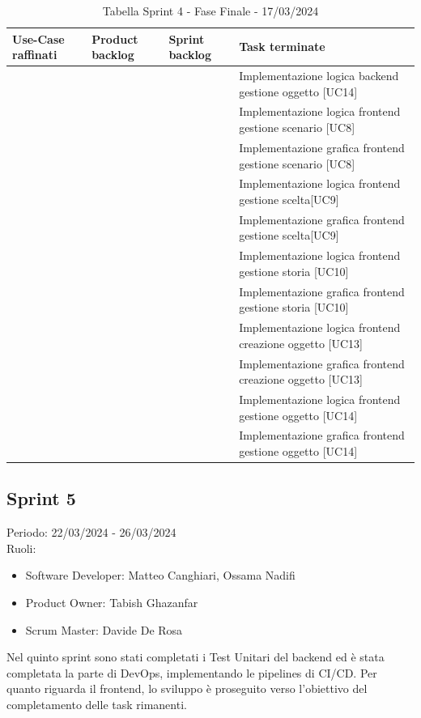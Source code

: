 \documentclass{article}
\begin{document}
\begin{table}[h]
    \centering
    \begin{tabularx}{\textwidth}{|X|X|X|X|}
        \hline
        \bf Use-Case raffinati & \bf Product backlog & \bf Sprint backlog & \bf Task terminate \\
        \hline
        & & & Implementazione logica backend gestione oggetto [UC14] \\
        \hline
        & & & Implementazione logica frontend gestione scenario [UC8] \\
        \hline
        & & & Implementazione grafica frontend gestione scenario [UC8] \\
        \hline
        & & & Implementazione logica frontend gestione scelta[UC9] \\
        \hline
        & & & Implementazione grafica frontend gestione scelta[UC9] \\
        \hline
        & & & Implementazione logica frontend gestione storia [UC10] \\
        \hline
        & & & Implementazione grafica frontend gestione storia [UC10] \\
        \hline
        & & & Implementazione logica frontend creazione oggetto [UC13] \\
        \hline
        & & & Implementazione grafica frontend creazione oggetto [UC13] \\
        \hline
        & & & Implementazione logica frontend gestione oggetto [UC14] \\
        \hline
        & & & Implementazione grafica frontend gestione oggetto [UC14] \\
        \hline
    \end{tabularx}
    \caption*{Tabella Sprint 4 - Fase Finale - 17/03/2024}
\end{table}

\clearpage
\subsection{Sprint 5}
Periodo: 22/03/2024 - 26/03/2024\vspace*{7pt}\\
Ruoli:
\begin{itemize}[label = { }]
    \itemsep0em
    \item Software Developer: Matteo Canghiari, Ossama Nadifi 
    \item Product Owner: Tabish Ghazanfar
    \item Scrum Master: Davide De Rosa
\end{itemize}
Nel quinto sprint sono stati completati i Test Unitari del backend ed è stata completata la parte di DevOps, implementando le pipelines di CI/CD. Per quanto riguarda il frontend, lo sviluppo è proseguito verso l'obiettivo del completamento delle task rimanenti.
\end{document}
